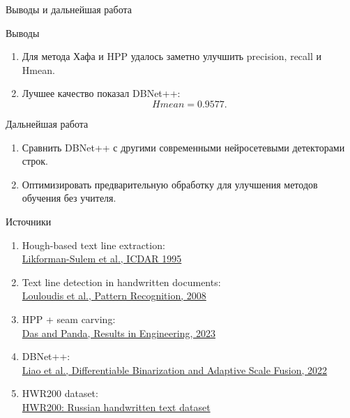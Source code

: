 \documentclass[12pt,pdf,hyperref={unicode}]{beamer}
\begin{document}
\begin{frame}{Выводы и дальнейшая работа}

\small

\begin{block}{Выводы}
\begin{enumerate}
    \item Для метода Хафа и HPP удалось заметно улучшить precision, recall и Hmean.
    \item Лучшее качество показал DBNet++:
    \[
        Hmean = 0.9577.
    \]
\end{enumerate}
\end{block}

\vspace{1mm}

\begin{block}{Дальнейшая работа}
\begin{enumerate}
    \item Сравнить DBNet++ с другими современными нейросетевыми детекторами строк.
    \item Оптимизировать предварительную обработку для улучшения методов обучения без учителя.
\end{enumerate}
\end{block}

\end{frame}

\begin{frame}{Источники}

\footnotesize

\begin{enumerate}
    \item Hough-based text line extraction: \\
    \href{https://ieeexplore.ieee.org/document/602034}
    {Likforman-Sulem et al., ICDAR 1995}

    \item Text line detection in handwritten documents: \\
    \href{https://doi.org/10.1016/j.patcog.2008.05.011}
    {Louloudis et al., Pattern Recognition, 2008}

    \item HPP + seam carving: \\
    \href{https://www.sciencedirect.com/science/article/pii/S2590123023002372}
    {Das and Panda, Results in Engineering, 2023}

    \item DBNet++: \\
    \href{https://arxiv.org/abs/2202.10304}
    {Liao et al., Differentiable Binarization and Adaptive Scale Fusion, 2022}

    \item HWR200 dataset: \\
    \href{https://huggingface.co/datasets/AntiplagiatCompany/HWR200}
    {HWR200: Russian handwritten text dataset}
\end{enumerate}

\end{frame}
\end{document}
